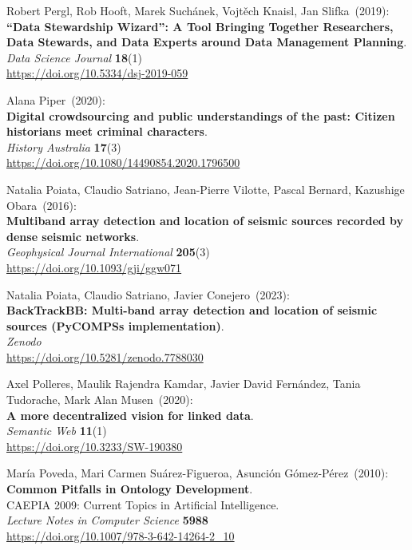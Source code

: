 \begin{thebibliography}{9}
Robert Pergl, Rob Hooft, Marek Suchánek, Vojtěch
Knaisl, Jan Slifka~(2019): \\
\textbf{``Data Stewardship Wizard'': A Tool Bringing Together
Researchers, Data Stewards, and Data Experts around Data Management
Planning}.\\
\emph{Data Science Journal} \textbf{18}(1)\\
\url{https://doi.org/10.5334/dsj-2019-059}

Alana Piper~(2020): \\
\textbf{Digital crowdsourcing and public understandings of the past:
Citizen historians meet criminal characters}.\\
\emph{History Australia} \textbf{17}(3) \\
\url{https://doi.org/10.1080/14490854.2020.1796500}

Natalia Poiata, Claudio Satriano, Jean-Pierre Vilotte, Pascal Bernard, Kazushige Obara~(2016): \\
\textbf{Multiband array detection and location of seismic sources recorded by dense seismic networks}.\\
\emph{Geophysical Journal International} \textbf{205}(3)\\
\url{https://doi.org/10.1093/gji/ggw071}

Natalia Poiata, Claudio Satriano, Javier Conejero~(2023): \\
\textbf{BackTrackBB: Multi-band array detection and location of seismic sources (PyCOMPSs implementation)}.\\
\emph{Zenodo}\\
\url{https://doi.org/10.5281/zenodo.7788030}


Axel Polleres, Maulik Rajendra Kamdar, Javier David Fernández, Tania
Tudorache, Mark Alan Musen~(2020): \\
\textbf{A more decentralized vision for linked data}.\\ 
\emph{Semantic Web} \textbf{11}(1) \\
\url{https://doi.org/10.3233/SW-190380}

María Poveda, Mari Carmen Suárez-Figueroa, Asunción Gómez-Pérez~(2010): \\
\textbf{Common Pitfalls in Ontology Development}.\\
CAEPIA 2009: Current Topics in Artificial Intelligence.\\
\emph{Lecture Notes in Computer Science} \textbf{5988}\\
\url{https://doi.org/10.1007/978-3-642-14264-2_10}\\


\end{thebibliography}
